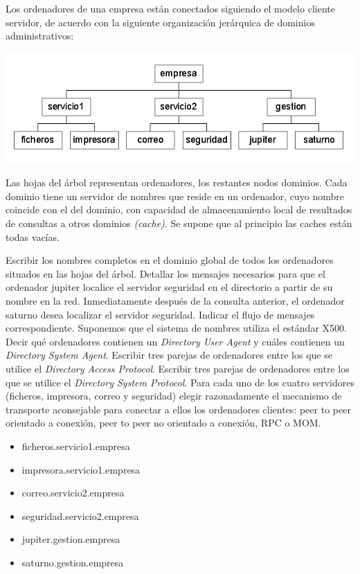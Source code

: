   \begin{problem}[20]
  Los ordenadores de una empresa están conectados siguiendo el modelo cliente
servidor, de acuerdo con la siguiente organización jerárquica de dominios
administrativos:
\begin{center}
\includegraphics[width=1\textwidth]{img/si2-t4-ej-dom2.png}
\end{center}

   Las hojas del árbol representan ordenadores, los restantes nodos
dominios. Cada dominio tiene un servidor de nombres que reside en un
ordenador, cuyo nombre coincide con el del dominio, con capacidad de
almacenamiento local de resultados de consultas a otros dominios \textit{(cache)}. Se supone que al principio las caches están todas vacías.

    \ppart Escribir los nombres completos en el dominio global de todos los ordenadores
    situados en las hojas del árbol.
    \ppart Detallar los mensajes necesarios para que el ordenador jupiter localice
    el servidor seguridad en el directorio a partir de su nombre en la red.
    \ppart Inmediatamente después de la consulta anterior, el
ordenador saturno desea localizar el servidor seguridad. Indicar el
flujo de mensajes correspondiente.
    \ppart Suponemos que el sistema de nombres utiliza el estándar X500. Decir qué ordenadores contienen un \textit{Directory User Agent} y cuáles contienen un \textit{Directory System Agent}.
    \ppart Escribir tres parejas de ordenadores entre los que se utilice el \textit{Directory Access Protocol}.
    \ppart Escribir tres parejas de ordenadores entre los que se utilice el \textit{Directory System Protocol}.
    \ppart Para cada uno de los cuatro servidores (ficheros,
impresora, correo y seguridad) elegir razonadamente el mecanismo de
transporte aconsejable para conectar a ellos los ordenadores clientes:
peer to peer orientado a conexión, peer to peer no orientado a conexión,
 RPC o MOM.

\solution

\spart
\begin{itemize}
\item ficheros.servicio1.empresa
\item impresora.servicio1.empresa
\item correo.servicio2.empresa
\item seguridad.servicio2.empresa
\item jupiter.gestion.empresa
\item saturno.gestion.empresa
\end{itemize}


\end{problem}
